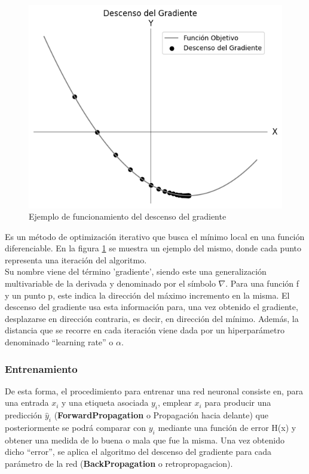 \begin{figure}[H]
	\centering
	\includegraphics[scale=0.4]{imagenes/sgd.jpg}  
	\caption{Ejemplo de funcionamiento del descenso del gradiente}
	\label{fig:SGD}
\end{figure}

Es un método de optimización iterativo que busca el mínimo local en una función diferenciable. En la figura \ref{fig:SGD} se muestra un ejemplo del mismo, donde cada punto representa una iteración del algoritmo. \\
Su nombre viene del término 'gradiente', siendo este una generalización multivariable de la derivada y denominado por el símbolo $\nabla$. Para una función f y un punto p, este indica la dirección del máximo incremento en la misma. El descenso del gradiente usa esta información para, una vez obtenido el gradiente, desplazarse en dirección contraria, es decir, en dirección del mínimo. Además, la distancia que se recorre en cada iteración viene dada por un hiperparámetro denominado ``learning rate'' o $\alpha$. \cite{SGD_1} \cite{Gradiente} \cite{SGD_2} \\


\subsubsection{Entrenamiento}
De esta forma, el procedimiento para entrenar una red neuronal consiste en, para una entrada $x_i$ y una etiqueta asociada $y_i$, emplear $x_i$ para producir una predicción $\hat{y}_i$ (\textbf{ForwardPropagation} o Propagación hacia delante) que posteriormente se podrá comparar con $y_i$ mediante una función de error H(x) y obtener una medida de lo buena o mala que fue la misma. Una vez obtenido dicho ``error'', se aplica el algoritmo del descenso del gradiente para cada parámetro de la red (\textbf{BackPropagation} o retropropagacion). \cite{Cross_entropy} \\

